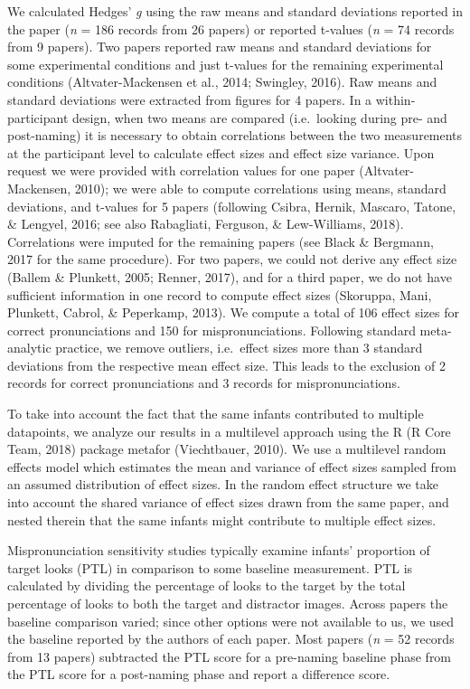 \documentclass[man]{apa6}
\theoremstyle{definition}
\theoremstyle{definition}
\theoremstyle{definition}
\theoremstyle{remark}
\begin{document}
We calculated Hedges' \emph{g} using the raw means and standard
deviations reported in the paper (\emph{n} = 186 records from 26 papers)
or reported t-values (\emph{n} = 74 records from 9 papers). Two papers
reported raw means and standard deviations for some experimental
conditions and just t-values for the remaining experimental conditions
(Altvater-Mackensen et al., 2014; Swingley, 2016). Raw means and
standard deviations were extracted from figures for 4 papers. In a
within-participant design, when two means are compared (i.e.~looking
during pre- and post-naming) it is necessary to obtain correlations
between the two measurements at the participant level to calculate
effect sizes and effect size variance. Upon request we were provided
with correlation values for one paper (Altvater-Mackensen, 2010); we
were able to compute correlations using means, standard deviations, and
t-values for 5 papers (following Csibra, Hernik, Mascaro, Tatone, \&
Lengyel, 2016; see also Rabagliati, Ferguson, \& Lew-Williams, 2018).
Correlations were imputed for the remaining papers (see Black \&
Bergmann, 2017 for the same procedure). For two papers, we could not
derive any effect size (Ballem \& Plunkett, 2005; Renner, 2017), and for
a third paper, we do not have sufficient information in one record to
compute effect sizes (Skoruppa, Mani, Plunkett, Cabrol, \& Peperkamp,
2013). We compute a total of 106 effect sizes for correct pronunciations
and 150 for mispronunciations. Following standard meta-analytic
practice, we remove outliers, i.e.~effect sizes more than 3 standard
deviations from the respective mean effect size. This leads to the
exclusion of 2 records for correct pronunciations and 3 records for
mispronunciations.

To take into account the fact that the same infants contributed to
multiple datapoints, we analyze our results in a multilevel approach
using the R (R Core Team, 2018) package metafor (Viechtbauer, 2010). We
use a multilevel random effects model which estimates the mean and
variance of effect sizes sampled from an assumed distribution of effect
sizes. In the random effect structure we take into account the shared
variance of effect sizes drawn from the same paper, and nested therein
that the same infants might contribute to multiple effect sizes.

Mispronunciation sensitivity studies typically examine infants'
proportion of target looks (PTL) in comparison to some baseline
measurement. PTL is calculated by dividing the percentage of looks to
the target by the total percentage of looks to both the target and
distractor images. Across papers the baseline comparison varied; since
other options were not available to us, we used the baseline reported by
the authors of each paper. Most papers (\emph{n} = 52 records from 13
papers) subtracted the PTL score for a pre-naming baseline phase from
the PTL score for a post-naming phase and report a difference score.
\end{document}

